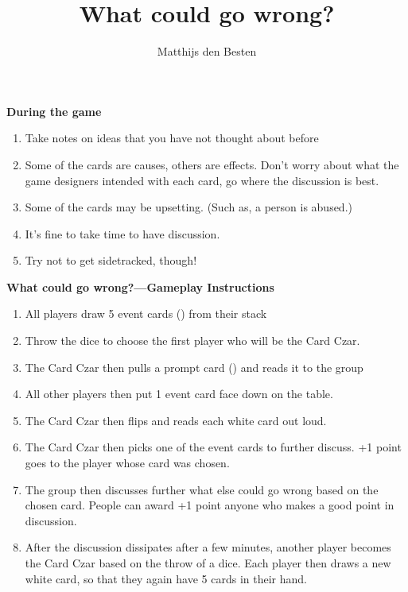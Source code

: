 \documentclass[grid,avery5371]{flashcards}
\title{What could go wrong?}
\author{Matthijs den Besten}
\begin{document}

\begin{flashcard}{
{\bf\small During the game}
\begin{multicols}{2}
\begin{enumerate}\tiny \setlength{\itemsep}{.5ex}
    \item Take notes on ideas that you have not thought about before
    \item Some of the cards are causes, others are effects. Don’t worry about what the game designers intended with each card, go where the discussion is best.
    \item Some of the cards may be upsetting. (Such as, a person is abused.)
    \item It’s fine to take time to have discussion.
    \item Try not to get sidetracked, though!
\end{enumerate}
\end{multicols}
}
{\bf\small What could go wrong?---Gameplay Instructions}
\begin{multicols}{2}
    \begin{enumerate}\tiny \setlength\itemsep{.2ex}
        \item All players draw 5 event cards () from their stack
        \item Throw the dice to choose the first player who will be the Card Czar.
        \item The Card Czar then pulls a prompt card () and reads it to the group
        \item All other players then put 1 event card face down on the table.   
        \item The Card Czar then flips and reads each white card out loud.
        \item The Card Czar then picks one of the event cards to further discuss. +1 point goes to the player whose card was chosen.
        \item The group then discusses further what else could go wrong based on the chosen card. People can award +1 point anyone who makes a good point in discussion.
        \item After the discussion dissipates after a few minutes, another player becomes the Card Czar based on the throw of a dice. Each player then draws a new white card, so that they again have 5 cards in their hand.
    \end{enumerate}
    \end{multicols}
\end{flashcard}
\end{document}
